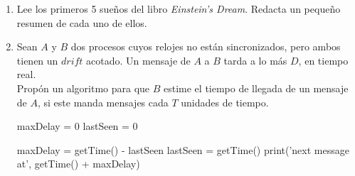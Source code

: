 \documentclass[12pt,a4paper]{report}
\begin{document}
\begin{enumerate}
		\item {
			Lee los primeros 5 sueños del libro \textit{Einstein's Dream}.
			Redacta un pequeño resumen de cada uno de ellos.
		}

		\item {
			Sean $A$ y $B$ dos procesos cuyos relojes no están sincronizados,
			pero ambos tienen un $drift$ acotado. Un mensaje de $A$ a $B$
			tarda a lo más $D$, en tiempo real.\\
			Propón un algoritmo para que $B$ estime el tiempo de llegada de un
			mensaje de $A$, si este manda mensajes cada $T$ unidades de tiempo.

			\begin{algorithmic}[1]
				\Initially
				 	\State maxDelay = 0
					\State lastSeen = 0
				\EndInitially
				\Statex

						\State maxDelay = getTime() - lastSeen
					\EndIf
					\State lastSeen = getTime()
					\State print('next message at', getTime() + maxDelay)
				\EndUpon
			\end{algorithmic}
		}
	\end{enumerate}
\end{document}
